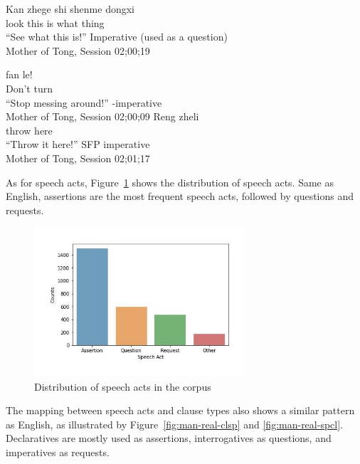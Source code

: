 \bxl\label{ex:man:impbare}
\gll Kan zhege shi shenme dongxi\\
look this is what thing\\
``See what this is!''  \hfill Imperative (used as a question)\\
Mother of Tong, Session 02;00;19

\ex \label{ex:man:impbie}
\gll {} fan le!\\
Don't turn \Asp{}\\
``Stop messing around!'' \hfill {}-imperative\\Mother of Tong, Session 02;00;09
\ex \label{ex:man:impba}
\gll Reng zheli \\
throw here \Sfp{}\\
\trans ``Throw it here!''
\hfill SFP imperative\\Mother of Tong, Session 02;01;17
\exl
\eex


As for speech acts, Figure~\ref{fig:man-real-sp} shows the distribution of speech acts. Same as English, assertions are the most frequent speech acts, followed by questions and requests. 
\begin{figure}[H]
    \centering
    \includegraphics[width=0.7\textwidth]{figures/man-real-sp.jpg}
    \caption{Distribution of speech acts in the corpus}
    \label{fig:man-real-sp}
\end{figure}

The mapping between speech acts and clause types also shows a similar pattern as English, as illustrated by Figure~\ref{fig:man-real-clsp} and \ref{fig:man-real-spcl}. Declaratives are mostly used as assertions, interrogatives as questions, and imperatives as requests. 

